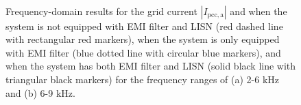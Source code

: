 \documentclass[journal,a4paper,10pt,twoside]{IEEEtran} %
\begin{document}
	\begin{figure}[t]
	    \centering
	    \\
		\vspace{-3mm}
		\caption{Frequency-domain results for the grid current $|I_{\mathrm{pcc,a}}|$ and when the system is not equipped with EMI filter and LISN (red dashed line with rectangular red markers), when the system is only equipped with EMI filter (blue dotted line with circular blue markers), and when the system has both EMI filter and LISN (solid black line with triangular black markers) for the frequency ranges of (a) 2-6 kHz and (b) 6-9 kHz.}
		\label{FIG11}
	\end{figure}
    
\end{document}
